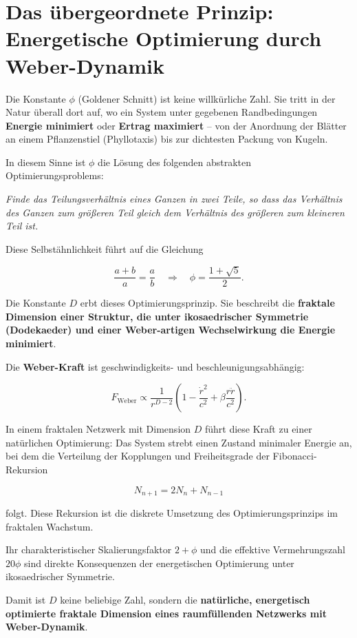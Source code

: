 \documentclass[11pt,a4paper]{article}
\begin{document}
\section{Das übergeordnete Prinzip: Energetische Optimierung durch Weber-Dynamik}

Die Konstante \( \phi \) (Goldener Schnitt) ist keine willkürliche Zahl. Sie tritt in der Natur überall dort auf, wo ein System unter gegebenen Randbedingungen \textbf{Energie minimiert} oder \textbf{Ertrag maximiert} – von der Anordnung der Blätter an einem Pflanzenstiel (Phyllotaxis) bis zur dichtesten Packung von Kugeln.

In diesem Sinne ist \( \phi \) die Lösung des folgenden abstrakten Optimierungsproblems:

\emph{Finde das Teilungsverhältnis eines Ganzen in zwei Teile, so dass das Verhältnis des Ganzen zum größeren Teil gleich dem Verhältnis des größeren zum kleineren Teil ist.}

Diese Selbstähnlichkeit führt auf die Gleichung  

\[
\frac{a+b}{a} = \frac{a}{b} \quad \Rightarrow \quad \phi = \frac{1+\sqrt{5}}{2}.
\]

Die Konstante \( D \) erbt dieses Optimierungsprinzip. Sie beschreibt die \textbf{fraktale Dimension einer Struktur, die unter ikosaedrischer Symmetrie (Dodekaeder) und einer Weber-artigen Wechselwirkung die Energie minimiert}.

Die \textbf{Weber-Kraft} ist geschwindigkeits- und beschleunigungsabhängig:

\[
F_{\text{Weber}} \propto \frac{1}{r^{D-2}} \left( 1 - \frac{\dot{r}^2}{c^2} + \beta \frac{r\ddot{r}}{c^2} \right).
\]

In einem fraktalen Netzwerk mit Dimension \( D \) führt diese Kraft zu einer natürlichen Optimierung: Das System strebt einen Zustand minimaler Energie an, bei dem die Verteilung der Kopplungen und Freiheitsgrade der Fibonacci-Rekursion  

\[
N_{n+1} = 2N_n + N_{n-1}
\]

folgt. Diese Rekursion ist die diskrete Umsetzung des Optimierungsprinzips im fraktalen Wachstum.

Ihr charakteristischer Skalierungsfaktor \( 2 + \phi \) und die effektive Vermehrungszahl \( 20\phi \) sind direkte Konsequenzen der energetischen Optimierung unter ikosaedrischer Symmetrie.

Damit ist \( D \) keine beliebige Zahl, sondern die \textbf{natürliche, energetisch optimierte fraktale Dimension eines raumfüllenden Netzwerks mit Weber-Dynamik}.
\end{document}
